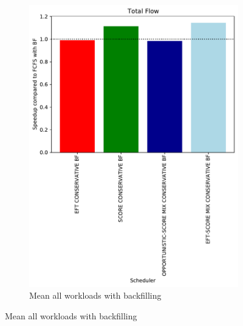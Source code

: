 \documentclass[a4paper]{article}
\begin{document}
\begin{figure}[H]
\begin{subfigure}[b]{0.4\linewidth}\centering\includegraphics[width=1\linewidth]{MBSS/plot/Results_Percentage_FCFS_BF_All_workloads_mean_Total_flow_450_128_32_256_4_1024.pdf}\caption{Mean all workloads with backfilling}\end{subfigure}

\end{figure}
\end{document}
